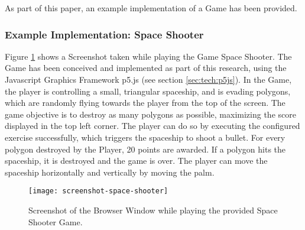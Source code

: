 As part of this paper, an example implementation of a Game has been provided.

\subsubsection{Example Implementation: Space Shooter}
Figure \ref{fig:screenshot-space-shooter} shows a Screenshot taken while playing the Game Space Shooter. The Game has been conceived and implemented as part of this research, using the Javascript Graphics Framework p5.js (see section \ref{sec:tech:p5js}). In the Game, the player is controlling a small, triangular spaceship, and is evading polygons, which are randomly flying towards the player from the top of the screen. The game objective is to destroy as many polygons as possible, maximizing the score displayed in the top left corner. The player can do so by executing the configured exercise successfully, which triggers the spaceship to shoot a bullet. For every polygon destroyed by the Player, 20 points are awarded. If a polygon hits the spaceship, it is destroyed and the game is over. The player can move the spaceship horizontally and vertically by moving the palm.

\begin{figure}[t]
    \centering
    \texttt{[image: screenshot-space-shooter]}
    \caption{Screenshot of the Browser Window while playing the provided Space Shooter Game.}
    \label{fig:screenshot-space-shooter}
\end{figure}